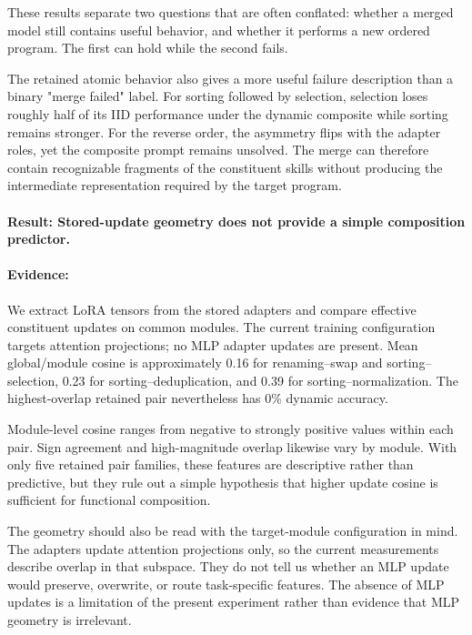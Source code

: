\documentclass[10pt,twocolumn]{article}
\begin{document}
These results separate two questions that are often conflated: whether a merged model still contains useful behavior, and whether it performs a new ordered program. The first can hold while the second fails.

The retained atomic behavior also gives a more useful failure description than a binary "merge failed" label. For sorting followed by selection, selection loses roughly half of its IID performance under the dynamic composite while sorting remains stronger. For the reverse order, the asymmetry flips with the adapter roles, yet the composite prompt remains unsolved. The merge can therefore contain recognizable fragments of the constituent skills without producing the intermediate representation required by the target program.

\paragraph{Result: Stored-update geometry does not provide a simple composition predictor.}

\paragraph{Evidence:} We extract LoRA tensors from the stored adapters and compare effective constituent updates on common modules. The current training configuration targets attention projections; no MLP adapter updates are present. Mean global/module cosine is approximately 0.16 for renaming--swap and sorting--selection, 0.23 for sorting--deduplication, and 0.39 for sorting--normalization. The highest-overlap retained pair nevertheless has 0\% dynamic accuracy.

Module-level cosine ranges from negative to strongly positive values within each pair. Sign agreement and high-magnitude overlap likewise vary by module. With only five retained pair families, these features are descriptive rather than predictive, but they rule out a simple hypothesis that higher update cosine is sufficient for functional composition.

The geometry should also be read with the target-module configuration in mind. The adapters update attention projections only, so the current measurements describe overlap in that subspace. They do not tell us whether an MLP update would preserve, overwrite, or route task-specific features. The absence of MLP updates is a limitation of the present experiment rather than evidence that MLP geometry is irrelevant.
\end{document}
